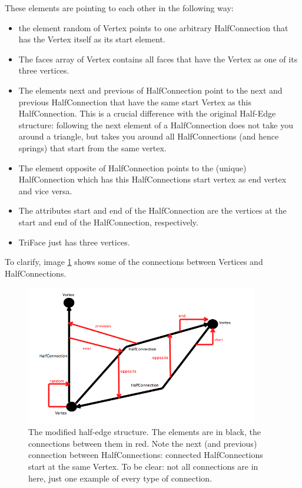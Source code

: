 These elements are pointing to each other in the following way:
\begin{itemize}
\item the element random of Vertex points to one arbitrary HalfConnection that has the Vertex itself as its start element.
\item The faces array of Vertex contains all faces that have the Vertex as one of its three vertices.
\item The elements next and previous of HalfConnection point to the next and previous HalfConnection that have the same start Vertex as this HalfConnection. This is a crucial difference with the original Half-Edge structure: following the next element of a HalfConnection does not take you around a triangle, but takes you around all HalfConnections (and hence springs) that start from the same vertex.
\item The element opposite of HalfConnection points to the (unique) HalfConnection which has this HalfConnections start vertex as end vertex and vice versa.
\item The attributes start and end of the HalfConnection are the vertices at the start and end of the HalfConnection, respectively.
\item TriFace just has three vertices.
\end{itemize}
To clarify, image \ref{structure} shows some of the connections between Vertices and HalfConnections.\\

\begin{figure}[!htb]
  \centering
  \includegraphics[width=4in,natwidth=366,natheight=166]{img/diagram.png}
  \caption
   {The modified half-edge structure. The elements are in black, the connections between them in red. Note the next (and previous) connection between HalfConnections: connected HalfConnections start at the same Vertex. To be clear: not all connections are in here, just one example of every type of connection.}
 \label{structure}
\end{figure}

